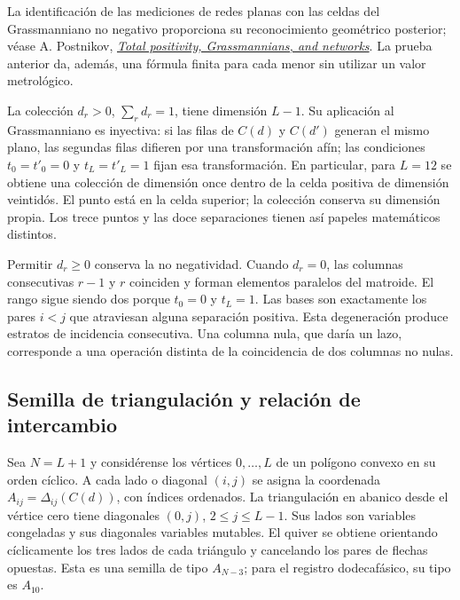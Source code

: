 La identificación de las mediciones de redes planas con las celdas del
Grassmanniano no negativo proporciona su reconocimiento geométrico posterior;
véase A. Postnikov,
\href{https://arxiv.org/abs/math/0609764}{\emph{Total positivity,
Grassmannians, and networks}}. La prueba anterior da, además, una fórmula
finita para cada menor sin utilizar un valor metrológico.

La colección \(d_r>0\), \(\sum_rd_r=1\), tiene dimensión \(L-1\).
Su aplicación al Grassmanniano es inyectiva: si las filas de \(C(d)\) y
\(C(d')\) generan el mismo plano, las segundas filas difieren por una
transformación afín; las condiciones \(t_0=t'_0=0\) y
\(t_L=t'_L=1\) fijan esa transformación. En particular, para \(L=12\)
se obtiene una colección de dimensión once dentro de la celda positiva de
dimensión veintidós. El punto está en la celda superior; la colección conserva
su dimensión propia. Los trece puntos y las doce separaciones tienen así
papeles matemáticos distintos.

Permitir \(d_r\ge0\) conserva la no negatividad. Cuando \(d_r=0\), las
columnas consecutivas \(r-1\) y \(r\) coinciden y forman elementos
paralelos del matroide. El rango sigue siendo dos porque \(t_0=0\) y
\(t_L=1\). Las bases son exactamente los pares \(i<j\) que atraviesan
alguna separación positiva. Esta degeneración produce estratos de incidencia
consecutiva. Una columna nula, que daría un lazo, corresponde a una operación
distinta de la coincidencia de dos columnas no nulas.

\subsection{Semilla de triangulación y relación de intercambio}

Sea \(N=L+1\) y considérense los vértices \(0,\ldots,L\) de un polígono
convexo en su orden cíclico. A cada lado o diagonal \((i,j)\) se asigna
la coordenada \(A_{ij}=\Delta_{ij}(C(d))\), con índices ordenados.
La triangulación en abanico desde el vértice cero tiene diagonales
\((0,j)\), \(2\le j\le L-1\). Sus lados son variables congeladas y
sus diagonales variables mutables. El quiver se obtiene orientando
cíclicamente los tres lados de cada triángulo y cancelando los pares de
flechas opuestas. Esta es una semilla de tipo \(A_{N-3}\); para el registro
dodecafásico, su tipo es \(A_{10}\).

